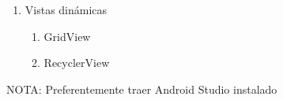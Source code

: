\documentclass[11pt]{mylib/documentoProteco}
\begin{document}
\begin{multicols*}{2}
\begin{enumerate}
  \item Vistas dinámicas
  \begin{enumerate}
    \item GridView
    \item RecyclerView
  \end{enumerate}

\end{enumerate}

\columnbreak
\noindent
NOTA: Preferentemente traer Android Studio instalado

\end{multicols*}
\end{document}
